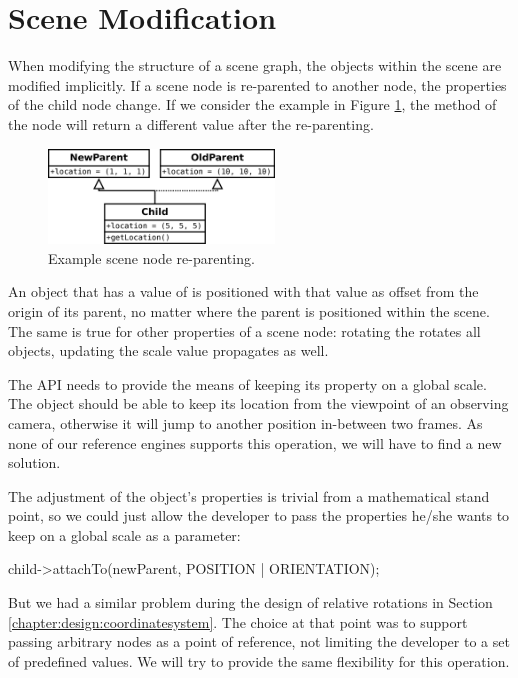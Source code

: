 \section{Scene Modification}

	When modifying the structure of a scene graph, the objects within the scene are modified implicitly. If a scene node is re-parented to another node, the properties of the child node change. If we consider the example in Figure \ref{fig:SceneNodeReparenting1}, the  method of the  node will return a different value after the re-parenting.

	\begin{figure}[htbp]
		\centering
		\includegraphics[width=6cm]{images/SceneNodeReparenting1.png}
		\caption{Example scene node re-parenting.}
		\label{fig:SceneNodeReparenting1}
	\end{figure}

	An object that has a  value of  is positioned with that value as offset from the origin of its parent, no matter where the parent is positioned within the scene. The same is true for other properties of a scene node: rotating the  rotates all objects, updating the scale value propagates as well.

	The API needs to provide the means of keeping its property on a global scale. The object should be able to keep its location from the viewpoint of an observing camera, otherwise it will jump to another position in-between two frames. As none of our reference engines supports this operation, we will have to find a new solution.
	
	The adjustment of the object's properties is trivial from a mathematical stand point, so we could just allow the developer to pass the properties he/she wants to keep on a global scale as a parameter:

	\begin{code}[2]
		child->attachTo(newParent, POSITION | ORIENTATION);
	\end{code}

	But we had a similar problem during the design of relative rotations in Section \ref{chapter:design:coordinatesystem}. The choice at that point was to support passing arbitrary nodes as a point of reference, not limiting the developer to a set of predefined values. We will try to provide the same flexibility for this operation.

